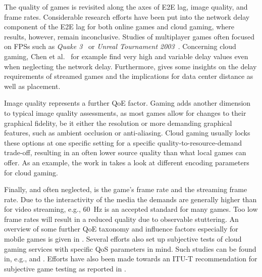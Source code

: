 The quality of games is revisited along the axes of \gls{E2E} lag, image quality, and frame rates.
Considerable research efforts have been put into the network delay component of the \gls{E2E} lag for both online games and cloud gaming, where results, however, remain inconclusive. Studies of multiplayer games often focused on \glspl{FPS} such as \textit{Quake 3}~\cite{1266180} or \textit{Unreal Tournament 2003}~\cite{Beigbeder:2004:ELL:1016540.1016556}. Concerning cloud gaming, Chen et al.~\cite{6670099} for example find very high and variable delay values even when neglecting the network delay. Furthermore, \cite{Choy:2012:BSC:2501560.2501563} gives some insights on the delay requirements of streamed games and the implications for data center distance as well as placement.

Image quality represents a further \gls{QoE} factor. Gaming adds another dimension to typical image quality assessments, as most games allow for changes to their graphical fidelity, be it either the resolution or more demanding graphical features, such as ambient occlusion or anti-aliasing. Cloud gaming usually locks these options at one specific setting for a specific quality-to-resource-demand trade-off, resulting in an often lower source quality than what local games can offer. As an example, the work in \cite{slivarimpact} takes a look at different encoding parameters for cloud gaming.%

Finally, and often neglected, is the game's frame rate and the streaming frame rate. Due to the interactivity of the media the demands are generally higher than for video streaming, e.g., \SI{60}{\hertz} is an accepted standard for many games. Too low frame rates will result in a reduced quality due to observable stuttering.
An overview of some further \gls{QoE} taxonomy and influence factors especially for mobile games is given in \cite{beyer2014typedisplaydelayimpact}. Several efforts also set up subjective tests of cloud gaming services with specific \gls{QoS} parameters in mind. Such studies can be found in, e.g., \cite{Jarschel20132883} and  \cite{6614351}. Efforts have also been made towards an \acrshort{ITU-T} recommendation for subjective game testing as reported in \cite{mollertowards}.






